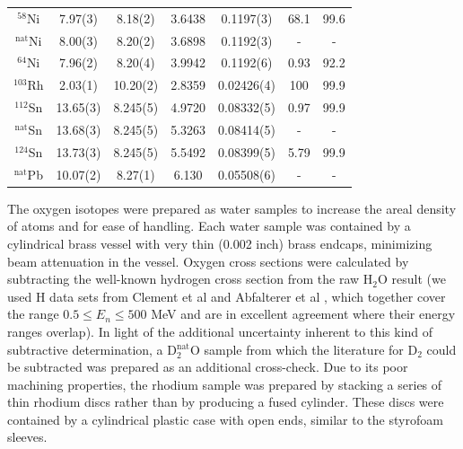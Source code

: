 \begin{table}[ht]
\begin{center}
\begin{tabular}{ c c c c c c c }
            $^{58}$Ni & 7.97(3)& 8.18(2) &
            3.6438 & 0.1197(3)& 68.1 & 99.6 \\
            $^{\text{nat}}$Ni & 8.00(3) & 8.20(2) &
            3.6898 & 0.1192(3)& - & -\\
            $^{64}$Ni & 7.96(2) & 8.20(4) &
            3.9942 & 0.1192(6) & 0.93 & 92.2\\

            $^{103}$Rh & 2.03(1) & 10.20(2) & 2.8359 & 0.02426(4) & 100 & 99.9\\

            $^{112}$Sn & 13.65(3) & 8.245(5) &
            4.9720 & 0.08332(5) & 0.97 & 99.9\\
            $^{\text{nat}}$Sn & 13.68(3) & 8.245(5) &
            5.3263 & 0.08414(5) & - & -\\
            $^{124}$Sn & 13.73(3) & 8.245(5) &
            5.5492 & 0.08399(5) & 5.79 & 99.9\\

            $^{\text{nat}}$Pb & 10.07(2) & 8.27(1) & 6.130 &
            0.05508(6) & - & -\\

            \hline
        \end{tabular}
    \end{center}
\end{table}

The oxygen isotopes were prepared as water samples to increase the areal density
of atoms and for ease of handling. Each water sample was contained by a
cylindrical brass vessel with very thin (0.002 inch) brass endcaps, minimizing
beam attenuation in the vessel. Oxygen cross sections were calculated by
subtracting the well-known hydrogen cross section from the raw H$_{2}$O result
(we used H \tots data sets from Clement et al \cite{Clement1972} and Abfalterer
et al \cite{Abfalterer2001}, which together cover the range $0.5 \leq E_n \leq 500$ MeV
and are in excellent agreement where their energy ranges overlap). In light of
the additional uncertainty inherent to this kind of subtractive \tots
determination, a D$_{2}^{\text{nat}}$O sample from which the literature \tots for
D$_{2}$ could be subtracted was prepared as an additional cross-check. Due to its poor 
machining properties, the rhodium
sample was prepared by stacking a series of thin rhodium discs rather than by
producing a fused cylinder. These discs were contained by a cylindrical plastic
case with open ends, similar to the styrofoam sleeves.



